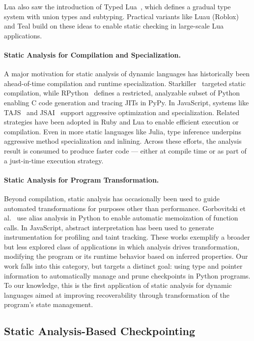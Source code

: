 Lua also saw the introduction of Typed Lua~\cite{maidl2014typed}, which defines a gradual type system with union types and subtyping. Practical variants like Luau (Roblox) and Teal build on these ideas to enable static checking in large-scale Lua applications.

\paragraph{Static Analysis for Compilation and Specialization.}
A major motivation for static analysis of dynamic languages has historically been ahead-of-time compilation and runtime specialization. Starkiller~\cite{salib2004starkiller} targeted static compilation, while RPython~\cite{ancona2007rpython} defines a restricted, analyzable subset of Python enabling C code generation and tracing JITs in PyPy. In JavaScript, systems like TAJS~\cite{jensen2009type} and JSAI~\cite{kashyap2014jsai} support aggressive optimization and specialization. Related strategies have been adopted in Ruby and Lua to enable efficient execution or compilation. Even in more static languages like Julia, type inference underpins aggressive method specialization and inlining. Across these efforts, the analysis result is consumed to produce faster code --- either at compile time or as part of a just-in-time execution strategy.

\paragraph{Static Analysis for Program Transformation.}
Beyond compilation, static analysis has occasionally been used to guide automated transformations for purposes other than performance. Gorbovitski et al.~\cite{gorbovitski2010alias} use alias analysis in Python to enable automatic memoization of function calls. In JavaScript, abstract interpretation has been used to generate instrumentation for profiling and taint tracking. These works exemplify a broader but less explored class of applications in which analysis drives transformation, modifying the program or its runtime behavior based on inferred properties. Our work falls into this category, but targets a distinct goal: using type and pointer information to automatically manage and prune checkpoints in Python programs. To our knowledge, this is the first application of static analysis for dynamic languages aimed at improving recoverability through transformation of the program’s state management.

\subsection{Static Analysis-Based Checkpointing}


